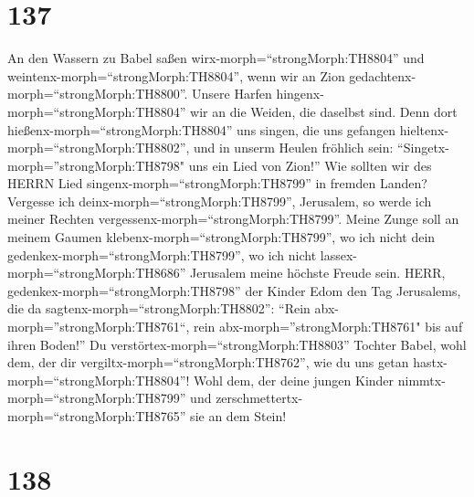 \hypertarget{section-136}{%
\section{137}\label{section-136}}

 An den Wassern zu Babel saßen
wirx-morph=``strongMorph:TH8804'' und
weintenx-morph=``strongMorph:TH8804'', wenn wir an Zion
gedachtenx-morph=``strongMorph:TH8800''.  Unsere Harfen
hingenx-morph=``strongMorph:TH8804'' wir an die Weiden, die daselbst
sind.  Denn dort hießenx-morph=``strongMorph:TH8804'' uns
singen, die uns gefangen hieltenx-morph=``strongMorph:TH8802'', und in
unserm Heulen fröhlich sein: ``Singetx-morph=''strongMorph:TH8798" uns
ein Lied von Zion!''  Wie sollten wir des HERRN Lied
singenx-morph=``strongMorph:TH8799'' in fremden Landen? 
Vergesse ich deinx-morph=``strongMorph:TH8799'', Jerusalem, so werde ich
meiner Rechten vergessenx-morph=``strongMorph:TH8799''. 
Meine Zunge soll an meinem Gaumen klebenx-morph=``strongMorph:TH8799'',
wo ich nicht dein gedenkex-morph=``strongMorph:TH8799'', wo ich nicht
lassex-morph=``strongMorph:TH8686'' Jerusalem meine höchste Freude sein.
 HERR, gedenkex-morph=``strongMorph:TH8798'' der Kinder Edom
den Tag Jerusalems, die da sagtenx-morph=``strongMorph:TH8802'': ``Rein
abx-morph=''strongMorph:TH8761``, rein abx-morph=''strongMorph:TH8761"
bis auf ihren Boden!''  Du
verstörtex-morph=``strongMorph:TH8803'' Tochter Babel, wohl dem, der dir
vergiltx-morph=``strongMorph:TH8762'', wie du uns getan
hastx-morph=``strongMorph:TH8804''!  Wohl dem, der deine
jungen Kinder nimmtx-morph=``strongMorph:TH8799'' und
zerschmettertx-morph=``strongMorph:TH8765'' sie an dem Stein!

\hypertarget{section-137}{%
\section{138}\label{section-137}}

